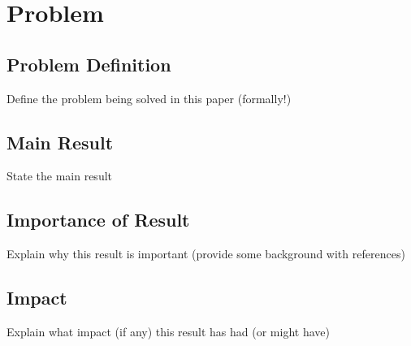 \section*{Problem}

\subsection*{Problem Definition}
    Define the problem being solved in this paper (formally!)

\subsection*{Main Result}
    State the main result

\subsection*{Importance of Result}
    Explain why this result is important (provide some background with
    references)

\subsection*{Impact}
    Explain what impact (if any) this result has had (or might have)
%

